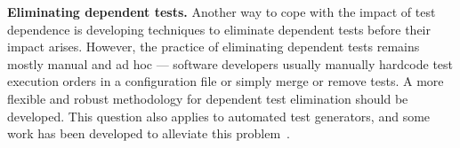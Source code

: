 \noindent \textbf{{Eliminating dependent tests.}}
Another way to cope with the impact of test dependence
is developing techniques to eliminate dependent tests
before their impact arises.
However, the practice of eliminating dependent tests
remains mostly manual and ad hoc --- software developers
usually manually hardcode test
execution orders in a configuration file or
simply merge or remove tests.
A more flexible and robust methodology for
dependent test elimination should be developed.
This question also applies to automated test generators,
and some work has been developed to alleviate
this problem~\cite{vmvm, RobinsonEPAL2011,fraseretal:ISSTA:2011}.




